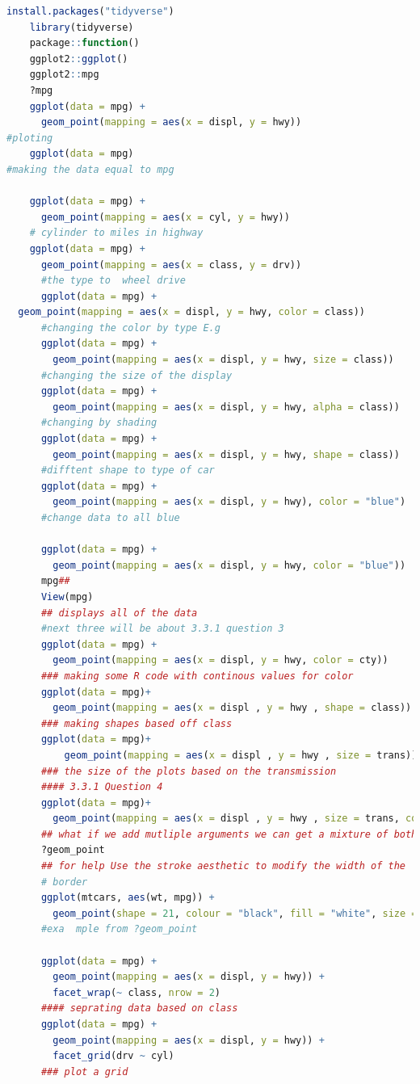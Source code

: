 \documentclass[11pt]{article}
\begin{document}
\begin{lstlisting}[language=R]
       install.packages("tidyverse")
    library(tidyverse)
    package::function()
    ggplot2::ggplot()
    ggplot2::mpg
    ?mpg
    ggplot(data = mpg) + 
      geom_point(mapping = aes(x = displ, y = hwy))
#ploting     
    ggplot(data = mpg)
#making the data equal to mpg

    ggplot(data = mpg) + 
      geom_point(mapping = aes(x = cyl, y = hwy))
    # cylinder to miles in highway
    ggplot(data = mpg) + 
      geom_point(mapping = aes(x = class, y = drv))
      #the type to  wheel drive
      ggplot(data = mpg) + 
  geom_point(mapping = aes(x = displ, y = hwy, color = class))
      #changing the color by type E.g 
      ggplot(data = mpg) + 
        geom_point(mapping = aes(x = displ, y = hwy, size = class))
      #changing the size of the display
      ggplot(data = mpg) + 
        geom_point(mapping = aes(x = displ, y = hwy, alpha = class))
      #changing by shading 
      ggplot(data = mpg) + 
        geom_point(mapping = aes(x = displ, y = hwy, shape = class))
      #difftent shape to type of car
      ggplot(data = mpg) + 
        geom_point(mapping = aes(x = displ, y = hwy), color = "blue")
      #change data to all blue 
      
      ggplot(data = mpg) + 
        geom_point(mapping = aes(x = displ, y = hwy, color = "blue"))
      mpg##
      View(mpg)
      ## displays all of the data 
      #next three will be about 3.3.1 question 3 
      ggplot(data = mpg) +
        geom_point(mapping = aes(x = displ, y = hwy, color = cty)) 
      ### making some R code with continous values for color 
      ggplot(data = mpg)+
        geom_point(mapping = aes(x = displ , y = hwy , shape = class))
      ### making shapes based off class
      ggplot(data = mpg)+
          geom_point(mapping = aes(x = displ , y = hwy , size = trans))
      ### the size of the plots based on the transmission 
      #### 3.3.1 Question 4 
      ggplot(data = mpg)+
        geom_point(mapping = aes(x = displ , y = hwy , size = trans, color = trans))
      ## what if we add mutliple arguments we can get a mixture of both 
      ?geom_point
      ## for help Use the stroke aesthetic to modify the width of the 
      # border 
      ggplot(mtcars, aes(wt, mpg)) +
        geom_point(shape = 21, colour = "black", fill = "white", size = 5, stroke = 5)
      #exa  mple from ?geom_point
      
      ggplot(data = mpg) + 
        geom_point(mapping = aes(x = displ, y = hwy)) + 
        facet_wrap(~ class, nrow = 2)
      #### seprating data based on class 
      ggplot(data = mpg) + 
        geom_point(mapping = aes(x = displ, y = hwy)) + 
        facet_grid(drv ~ cyl)
      ### plot a grid   
\end{lstlisting}
\end{document}
